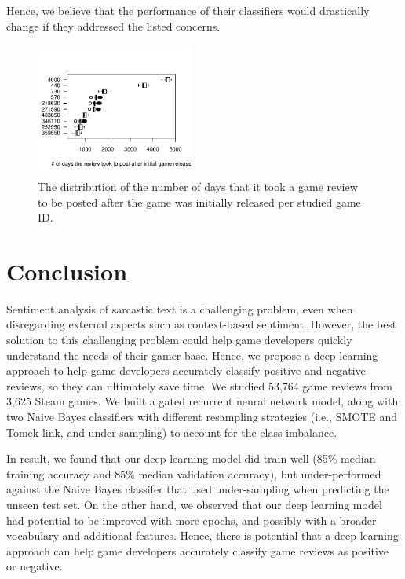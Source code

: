 \documentclass[conference]{IEEEtran}
\begin{document}
  Hence, we believe that the performance of their classifiers would drastically change if they addressed the listed concerns.


	
	\begin{figure}[!t]
\center
    \includegraphics[width=0.46\textwidth]{img/results/boxplot_num_days_after_initial_game_release.pdf}
  \caption{The distribution of the number of days that it took a game review to be posted after the game was initially released per studied game ID.}
  \label{fig:number_of_days}
\end{figure}


\section{Conclusion}

Sentiment analysis of sarcastic text is a challenging problem, even when disregarding external aspects such as context-based sentiment. However, the best solution to this challenging problem could help game developers quickly understand the needs of their gamer base. Hence, we propose a deep learning approach to help game developers accurately classify positive and negative reviews, so they can ultimately save time. We studied 53,764 game reviews from 3,625 Steam games. We built a gated recurrent neural network model, along with two Naive Bayes classifiers with different resampling strategies (i.e., SMOTE and Tomek link, and under-sampling) to account for the class imbalance. 

In result, we found that our deep learning model did train well (85\% median training accuracy and 85\% median validation accuracy), but under-performed against the Naive Bayes classifer that used under-sampling when predicting the unseen test set. On the other hand, we observed that our deep learning model had potential to be improved with more epochs, and possibly with a broader vocabulary and additional features. Hence, there is potential that a deep learning approach can help game developers accurately classify game reviews as positive or negative.
 

\end{document}
